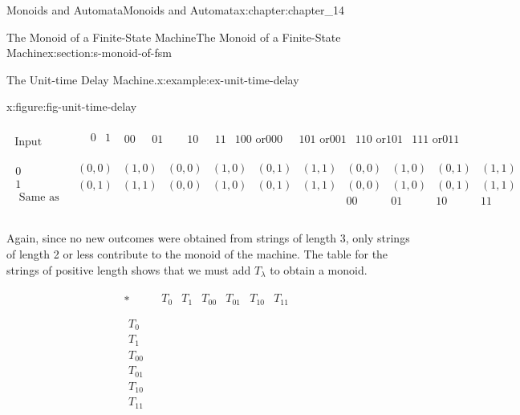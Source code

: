 \documentclass[oneside,10pt,]{book}
\numberwithin{equation}{section}
\begin{document}
\begin{chapterptx}{Monoids and Automata}{}{Monoids and Automata}{}{}{x:chapter:chapter_14}
\begin{sectionptx}{The Monoid of a Finite-State Machine}{}{The Monoid of a Finite-State Machine}{}{}{x:section:s-monoid-of-fsm}
\begin{example}{The Unit-time Delay Machine.}{x:example:ex-unit-time-delay}
\begin{figureptx}{}{x:figure:fig-unit-time-delay}{}
\begin{image}{0.15}{0.7}{0.15}
\end{image}%
\tcblower
\end{figureptx}%
\(\begin{array}{c|c}
\textrm{ Input} & 
\begin{array}{cccccccccc}
& 
\begin{array}{cc}
0 & 1 \\
\end{array}
& 00\textrm{          } & 01\textrm{       } & \textrm{       }10\textrm{        } & 11 & 100\textrm{ or}000\textrm{ 
} & 101\textrm{ or}001 & 110\textrm{ or}101 & 111\textrm{ or}011 \\
\end{array}
\\
\hline
\begin{array}{c}
0 \\
1 \\
\textrm{ Same} \textrm{ as} \\
\end{array}
& 
\begin{array}{cccccccccc}
(0,0) & (1,0) & (0,0) & (1,0) & (0,1) & (1,1) & (0,0) & (1,0) & (0,1) & (1,1) \\
(0,1) & (1,1) & (0,0) & (1,0) & (0,1) & (1,1) & (0,0) & (1,0) & (0,1) & (1,1) \\
&   &   &   &   &   & 00 & 01 & 10 & 11 \\
\end{array}
\\
\end{array}\)%
\par
Again, since no new outcomes were obtained from strings of length 3, only strings of length 2 or less contribute to the monoid of the machine. The table for the strings of positive length shows that we must add \(T_{\lambda }\) to obtain a monoid.%
\par
%
\begin{equation*}
\begin{array}{c|c}
* & 
\begin{array}{cccccc}
T_0 & T_1  & T_{00} & T_{01} & T_{10} & T_{11} \\
\end{array}
\\
\hline
\begin{array}{c}
T_0 \\
T_1 \\
T_{00} \\
T_{01} \\
T_{10} \\
T_{11} \\

\end{array}
\end{array}
\end{equation*}
\end{example}
\end{sectionptx}
\end{chapterptx}
\end{document}
